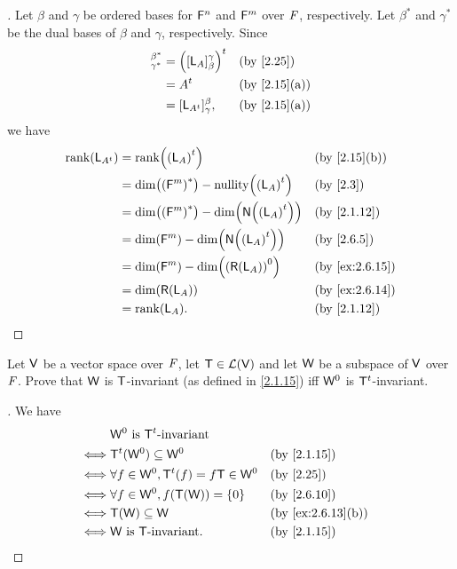 \begin{proof}[]
  Let \(\beta\) and \(\gamma\) be ordered bases for \(\mathsf{F}^n\) and \(\mathsf{F}^m\) over \(\mathit{F}\), respectively.
  Let \(\beta^*\) and \(\gamma^*\) be the dual bases of \(\beta\) and \(\gamma\), respectively.
  Since
  \begin{align*}
    [\tp{\pa{\L_A}}]_{\gamma^*}^{\beta^*} & = \tp{\pa{[\L_A]_{\beta}^{\gamma}}} &  & \by{2.25}    \\
                                          & = \tp{A}                            &  & \by{2.15}[a] \\
                                          & = [\L_{\tp{A}}]_{\gamma}^{\beta},   &  & \by{2.15}[a]
  \end{align*}
  we have
  \begin{align*}
    \rk{\L_{\tp{A}}} & = \rk{\tp{\pa{\L_A}}}                                     &  & \by{2.15}[b]   \\
                     & = \dim\pa{\pa{\vs{F}^m}^*} - \nt{\tp{\pa{\L_A}}}          &  & \by{2.3}       \\
                     & = \dim\pa{\pa{\vs{F}^m}^*} - \dim\pa{\ns{\tp{\pa{\L_A}}}} &  & \by{2.1.12}    \\
                     & = \dim\pa{\vs{F}^m} - \dim\pa{\ns{\tp{\pa{\L_A}}}}        &  & \by{2.6.5}     \\
                     & = \dim\pa{\vs{F}^m} - \dim\pa{\pa{\rg{\L_A}}^0}           &  & \by{ex:2.6.15} \\
                     & = \dim\pa{\rg{\L_A}}                                      &  & \by{ex:2.6.14} \\
                     & = \rk{\L_A}.                                              &  & \by{2.1.12}
  \end{align*}
\end{proof}

\begin{ex}\label{ex:2.6.17}
  Let \(\mathsf{V}\) be a vector space over \(\mathit{F}\), let \(\mathsf{T} \in \mathcal{L}(\mathsf{V})\) and let \(\mathsf{W}\) be a subspace of \(\mathsf{V}\) over \(\mathit{F}\).
  Prove that \(\mathsf{W}\) is \(\mathsf{T}\)-invariant (as defined in \cref{2.1.15}) iff \(\mathsf{W}^0\) is \({\mathsf{T}}^{t}\)-invariant.
\end{ex}

\begin{proof}[]
  We have
  \begin{align*}
         & \W^0 \text{ is } \tp{\T} \text{-invariant}                            \\
    \iff & \tp{\T}(\W^0) \subseteq \W^0                   &  & \by{2.1.15}       \\
    \iff & \forall f \in \W^0, \tp{\T}(f) = f \T \in \W^0 &  & \by{2.25}         \\
    \iff & \forall f \in \W^0, f(\T(\W)) = \set{0}        &  & \by{2.6.10}       \\
    \iff & \T(\W) \subseteq \W                            &  & \by{ex:2.6.13}[b] \\
    \iff & \W \text{ is } \T \text{-invariant}.           &  & \by{2.1.15}
  \end{align*}
\end{proof}

